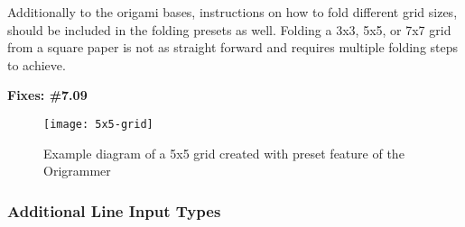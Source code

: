 Additionally to the origami bases, instructions on how to fold different grid sizes, should be included in the folding presets as well. Folding a 3x3, 5x5, or 7x7 grid from a square paper is not as straight forward and requires multiple folding steps to achieve. 

\textbf{Fixes: \#7.09}
 \begin{figure}[h]
	\centering
	\texttt{[image: 5x5-grid]}
	\caption{Example diagram of a 5x5 grid created with preset feature of the Origrammer}
	\label{fig:5x5-grid}
\end{figure}

\newpage
\subsubsection{Additional Line Input Types}

